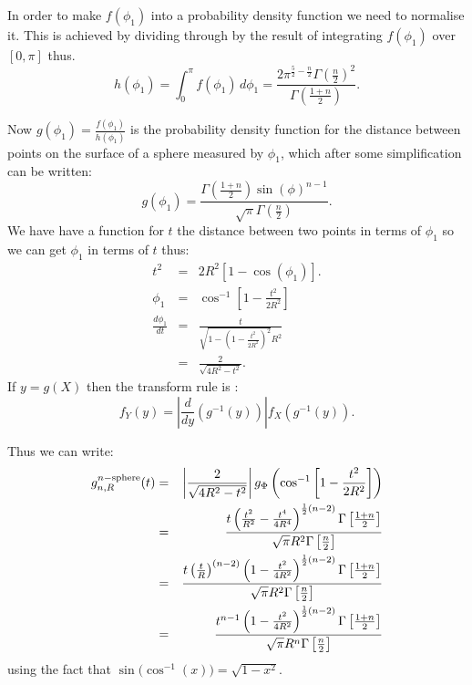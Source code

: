 In order to make $f(\phi_1)$ into a probability density function we
need to normalise it. This is achieved by dividing through by the
result of integrating $f(\phi_1)$ over $[0, \pi]$ thus.
 \begin{equation}      
 h(\phi_1) = \int_0^{\pi}  f(\phi_1) \, d\phi_1
           =  \frac{2 \pi ^{\frac{5}{2}-\frac{n}{2}} 
            \Gamma\left(\frac{n}{2}\right)^2}{\Gamma\left(\frac{1+n}{2}\right)}.
\end{equation}


Now $g(\phi_1) =\frac{f(\phi_1)}{ h(\phi_1)}$ is the  probability
density function for the distance between points on the surface of a
sphere measured by $\phi_1$, which after some simplification can be
written: 
\begin{equation}  
 g(\phi_1) = \frac{\Gamma\left(\frac{1+n}{2}\right) \sin(\phi )^{n - 1}}{\sqrt{\pi } \Gamma\left(\frac{n}{2}\right)}.
\end{equation} 
We have have a function for $t$ the distance between two points in
terms of $\phi_1$ so we can get  $\phi_1$ in terms of $t$ thus: 
\begin{eqnarray}
  t^2 & = & 2 R^2 \left[ 1 - \cos(\phi_1) \right].\\
\phi_1& =  & \cos^{-1} \left[1-\frac{t^2}{2 R^2}\right]\\ 
   \frac {d \phi_1}{dt} & = &\frac{t}{\sqrt{1-\left(1-\frac{t^2}{2 R^2}\right)^2} R^2} \\
   & = &\frac{2}{\sqrt{4 R^2 -t^2 }}.
\end{eqnarray}
If $y = g(X)$ then the transform rule  is :  
\[ f_Y(y) = \left| \frac{d}{dy} \left( g^{-1}(y) \right) \right|
                f_X\left( g^{-1}(y) \right).
\]

Thus we can write:
\begin{eqnarray}
  g^{n-{\rm sphere}}_{n,R}(t)
    & = & \left|\frac{2}{\sqrt{4 R^2 -t^2 }} \right|
             g_{\Phi}\left( \cos^{-1} \left[1-\frac{t^2}{2  R^2}\right]\right) \nonumber \\
    & = & \frac{t \left(\frac{t^2}{R^2} -\frac{t^4}{4 R^4}\right)^{\frac{1}{2} (n-2)}
             \Gamma\left[\frac{1+n}{2}\right]}{\sqrt{\pi } R^2 \Gamma\left[\frac{n}{2}\right]}  \nonumber \\
    & = & \frac{t \left(\frac{t}{R} \right)^{(n-2)}
             \left(1 -\frac{t^2}{4 R^2}\right)^{\frac{1}{2} (n-2)}
             \Gamma\left[\frac{1+n}{2}\right]}{\sqrt{\pi } R^2 \Gamma\left[\frac{n}{2}\right]}  \nonumber \\
    & = & \frac{t^{n-1}
             \left(1 -\frac{t^2}{4 R^2}\right)^{\frac{1}{2} (n-2)}
             \Gamma\left[\frac{1+n}{2}\right]}{\sqrt{\pi } R^n \Gamma\left[\frac{n}{2}\right]}  \nonumber \\
  \label{eq:nsphere_pdf_phi}
\end{eqnarray}
using the fact that $\sin\big( \cos^{-1}(x) \big) = \sqrt{1 - x^2}$.


